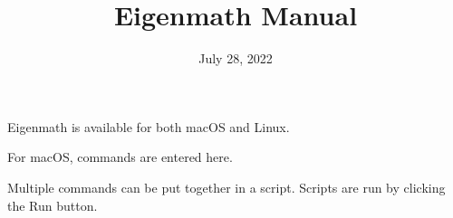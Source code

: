 \documentclass[12pt]{article}
\title{Eigenmath Manual}
\date{July 28, 2022}
\author{}
\begin{document}
\maketitle

\tableofcontents

\newpage

Eigenmath is available for both macOS and Linux.

\bigskip
For macOS, commands are entered here.

\begin{center}
\end{center}

Multiple commands can be put together in a script.
Scripts are run by clicking the Run button.

\begin{center}
\end{center}
\end{document}
